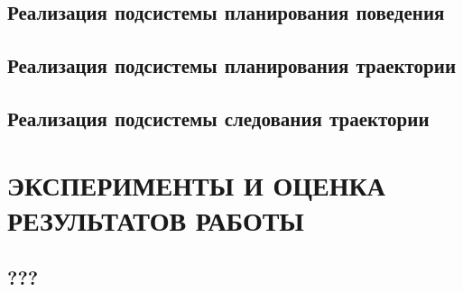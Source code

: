 \section{Реализация подсистемы планирования поведения}
\section{Реализация подсистемы планирования траектории}
\section{Реализация подсистемы следования траектории}

\chapter{ЭКСПЕРИМЕНТЫ И ОЦЕНКА РЕЗУЛЬТАТОВ РАБОТЫ}
\section{???}

